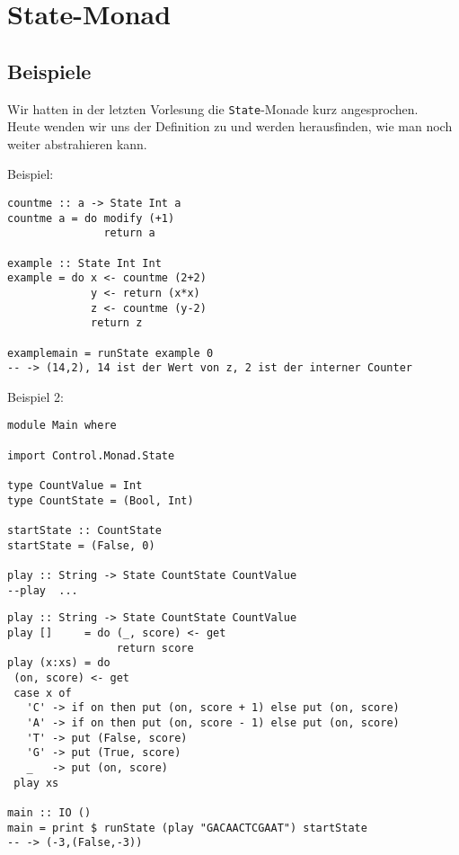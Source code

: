 \documentclass{beamer}
\begin{document}
\section{State-Monad}

\subsection{Beispiele}
\begin{frame}[fragile]
Wir hatten in der letzten Vorlesung die \texttt{State}-Monade kurz angesprochen.\\
Heute wenden wir uns der Definition zu und werden herausfinden, wie man noch weiter abstrahieren kann.\\
\end{frame}

\begin{frame}[fragile]
Beispiel:\bigskip

\begin{verbatim}
countme :: a -> State Int a
countme a = do modify (+1)
               return a

example :: State Int Int
example = do x <- countme (2+2)
             y <- return (x*x)
             z <- countme (y-2)
             return z

examplemain = runState example 0
-- -> (14,2), 14 ist der Wert von z, 2 ist der interner Counter
\end{verbatim}
\end{frame}

\begin{frame}[fragile]
Beispiel 2:\bigskip

\begin{verbatim}
module Main where

import Control.Monad.State

type CountValue = Int
type CountState = (Bool, Int)
 
startState :: CountState
startState = (False, 0)

play :: String -> State CountState CountValue
--play  ...

\end{verbatim}
\end{frame}

\begin{frame}[fragile]
\begin{verbatim}
play :: String -> State CountState CountValue
play []     = do (_, score) <- get
                 return score
play (x:xs) = do
 (on, score) <- get
 case x of
   'C' -> if on then put (on, score + 1) else put (on, score)
   'A' -> if on then put (on, score - 1) else put (on, score)
   'T' -> put (False, score)
   'G' -> put (True, score)
   _   -> put (on, score)
 play xs

main :: IO ()
main = print $ runState (play "GACAACTCGAAT") startState
-- -> (-3,(False,-3))
\end{verbatim}
\end{frame}
\end{document}
